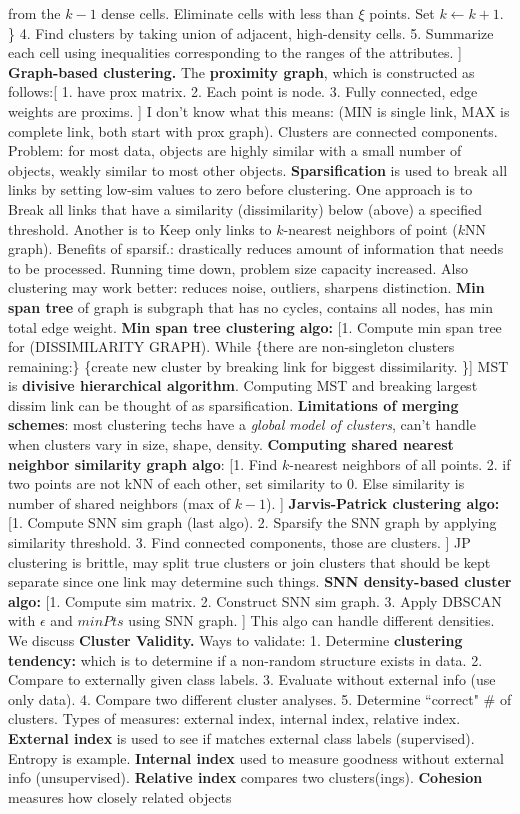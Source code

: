 \documentclass{amsbook}
\theoremstyle{plain}
\theoremstyle{definition}
\theoremstyle{remark}
\begin{document}
from the $k- 1$ dense cells. Eliminate cells with less than $\xi$ points. Set $k \longleftarrow k + 1$. \} 4. Find clusters by taking union of adjacent, high-density cells. 5. Summarize each cell using inequalities corresponding to the ranges of the attributes. ] \textbf{Graph-based clustering. } The \textbf{proximity graph}, which is constructed as follows:[ 1. have prox matrix. 2. Each point is node. 3. Fully connected, edge weights are proxims. ] I don't know what this means: (MIN is single link, MAX is complete link, both start with prox graph). Clusters are connected components. Problem: for most data, objects are highly similar with a small number of objects, weakly similar to most other objects. \textbf{Sparsification} is used to break all links by setting low-sim values to zero before clustering. One approach is to Break all links that have a similarity (dissimilarity) below (above) a specified threshold. Another is to Keep only links to $k$-nearest neighbors of point ($k$NN graph). Benefits of sparsif.: drastically reduces amount of information that needs to be processed. Running time down, problem size capacity increased. Also clustering may work better: reduces noise, outliers, sharpens distinction. \textbf{Min span tree} of graph is subgraph that has no cycles, contains all nodes, has min total edge weight. \textbf{Min span tree clustering algo: }[1. Compute min span tree for (DISSIMILARITY GRAPH). While \{there are non-singleton clusters remaining:\} \{create new cluster by breaking link for biggest dissimilarity. \}] MST is \textbf{divisive hierarchical algorithm}. Computing MST and breaking largest dissim link can be thought of as sparsification. \textbf{Limitations of merging schemes}:  most clustering techs have a \textit{global model of clusters}, can't handle when clusters vary in size, shape, density. \textbf{Computing shared nearest neighbor similarity graph algo}: [1. Find $k$-nearest neighbors of all points. 2. if two points are not kNN of each other, set similarity to 0. Else similarity is number of shared neighbors (max of $k - 1$). ] \textbf{Jarvis-Patrick clustering algo: }[1. Compute SNN sim graph (last algo). 2. Sparsify the SNN graph by applying similarity threshold. 3. Find connected components, those are clusters. ] JP clustering is brittle, may split true clusters or join clusters that should be kept separate since one link may determine such things. \textbf{SNN density-based cluster algo:} [1. Compute sim matrix. 2. Construct SNN sim graph. 3. Apply DBSCAN with $\epsilon$ and $minPts$ using SNN graph. ] This algo can handle different densities. We discuss \textbf{Cluster Validity. } Ways to validate: 1. Determine \textbf{clustering tendency:} which is to determine if a non-random structure exists in data. 2. Compare to externally given class labels. 3. Evaluate without external info (use only data). 4. Compare two different cluster analyses. 5. Determine ``correct" \# of clusters. Types of measures: external index, internal index, relative index. \textbf{External index} is used to see if matches external class labels (supervised). Entropy is example. \textbf{Internal index} used to measure goodness without external info (unsupervised). \textbf{Relative index} compares two clusters(ings). \textbf{Cohesion} measures how closely related objects 
\end{document}
